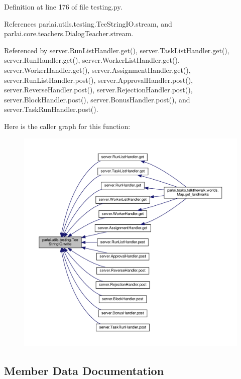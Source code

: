 Definition at line 176 of file testing.\+py.



References parlai.\+utils.\+testing.\+Tee\+String\+I\+O.\+stream, and parlai.\+core.\+teachers.\+Dialog\+Teacher.\+stream.



Referenced by server.\+Run\+List\+Handler.\+get(), server.\+Task\+List\+Handler.\+get(), server.\+Run\+Handler.\+get(), server.\+Worker\+List\+Handler.\+get(), server.\+Worker\+Handler.\+get(), server.\+Assignment\+Handler.\+get(), server.\+Run\+List\+Handler.\+post(), server.\+Approval\+Handler.\+post(), server.\+Reverse\+Handler.\+post(), server.\+Rejection\+Handler.\+post(), server.\+Block\+Handler.\+post(), server.\+Bonus\+Handler.\+post(), and server.\+Task\+Run\+Handler.\+post().

Here is the caller graph for this function\+:
\nopagebreak
\begin{figure}[H]
\begin{center}
\leavevmode
\includegraphics[width=350pt]{classparlai_1_1utils_1_1testing_1_1TeeStringIO_af8c256be884cbcb0081768bc04738015_icgraph}
\end{center}
\end{figure}


\subsection{Member Data Documentation}
\mbox{\label{classparlai_1_1utils_1_1testing_1_1TeeStringIO_a4dc6e50f503b4679fe3b3fa0ebd729f1}} 
